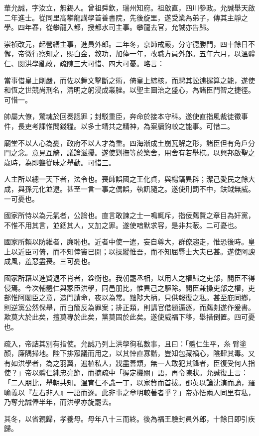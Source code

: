 \begin{pinyinscope}
華允誠，字汝立，無錫人。曾祖舜欽，瑞州知府。祖啟直，四川參政。允誠舉天啟二年進士。從同里高攀龍講學首善書院，先後旋里，遂受業為弟子，傳其主靜之學。四年春，從攀龍入都，授都水司主事。攀龍去官，允誠亦告歸。

崇禎改元，起營繕主事，進員外郎。二年冬，京師戒嚴，分守德勝門，四十餘日不懈，帝微行察知之，賜白金，敘功，加俸一年，改職方員外郎。五年六月，以溫體仁、閔洪學亂政，疏陳三大可惜、四大可憂。略言：

當事借皇上剛嚴，而佐以舞文擊斷之術，倚皇上綜核，而騁其訟逋握算之能，遂使和恆之世競尚刑名，清明之躬浸成叢脞。以聖主圖治之盛心，為諸臣鬥智之捷徑。可惜一。

帥屬大僚，驚魂於回奏認罪；封駁重臣，奔命於接本守科。遂使直指風裁徒徵事件，長吏考課惟問錢糧。以多士靖共之精神，為案牘鉤較之能事。可惜二。

廟堂不以人心為憂，政府不以人才為重。四海漸成土崩瓦解之形，諸臣但有角戶分門之念。意見互觭，議論滋擾。遂使剿撫等於築舍，用舍有若舉棋。以興邦啟聖之歲時，為即聾從昧之舉動。可惜三。

人主所以總一天下者，法令也。喪師誤國之王化貞，與楊鎬異辟；潔己愛民之餘大成，與孫元化並逮。甚至一言一事之偶誤，執訊隨之。遂使刑罰不中，鈇鉞無威。一可憂也。

國家所恃以為元氣者，公論也。直言敢諫之士一鳴輒斥，指佞薦賢之章目為奸黨，不惟不用其言，並錮其人，又加之罪。遂使喑默求容，是非共蔽。二可憂也。

國家所賴以防維者，廉恥也。近者中使一遣，妄自尊大，群僚趨走，惟恐後時。皇上以近臣可倚，而不知倖竇已開；以操縱惟吾，而不知屈辱士大夫已甚。遂使阿諛成風，羞惡盡喪。三可憂也。

國家所藉以進賢退不肖者，銓衡也。我朝罷丞相，以用人之權歸之吏部，閣臣不得侵焉。今次輔體仁與冢臣洪學，同邑朋比，惟異己之驅除。閣臣兼操吏部之權，吏部惟阿閣臣之意，造門請命，夜以為常。黜陟大柄，只供報復之私。甚至庇同鄉，則逆黨公然保舉，而白簡反為罪案；排正類，則講官借題逼逐，而薦剡遂作爰書。欺莫大於此矣，擅莫專於此矣，黨莫固於此矣。遂使威福下移，舉措倒置。四可憂也。

疏入，帝詰其別有指使。允誠乃列上洪學徇私數事，且曰：「體仁生平，糸臂塗顏，廉隅掃地。陛下排眾議而用之，以其悻直寡諧，豈知包藏禍心，陰肆其毒。又有如洪學者，為之羽翼，遍植私人，戕盡善類，無一人敢犯其鋒者，臣復受何人指使？」帝以體仁純忠亮節，而摘疏中「握定機關」語，再令陳狀。允誠復上言：「二人朋比，舉朝共知。溫育仁不識一丁，以家貲而首拔。鄧英以論沈演而謫，羅喻義以『左右非人』一語而逐。此非事之章明較著者乎？」帝亦悟兩人同里有私，乃奪允誠俸半年，而洪學亦旋罷去。

其冬，以省親歸，孝養母。母年八十三而終。後為福王驗封員外郎，十餘日即引疾歸。


\end{pinyinscope}
